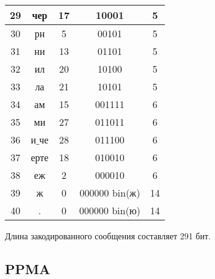 \begin{tabular}{|c|c|c|c|c|}
\hline
29 & чер & 17 & 10001 & 5\\
\hline
30 & рн & 5 & 00101 & 5\\
\hline
31 & ни & 13 & 01101 & 5\\
\hline
32 & ил & 20 & 10100 & 5\\
\hline
33 & ла & 21 & 10101 & 5\\
\hline
34 & ам & 15 & 001111 & 6\\
\hline
35 & ми & 27 & 011011 & 6\\
\hline
36 & и$\_$че & 28 & 011100 & 6\\
\hline
37 & ерте & 18 & 010010 & 6\\
\hline
38 & еж & 2 & 000010 & 6\\
\hline
39 & ж & 0 & 000000 bin(ж) & 14\\
\hline
40 & . & 0 & 000000 bin(ю) & 14\\
\hline
\end{tabular}

Длина закодированного сообщения составляет 291 бит.

\subsection{PPMA}


